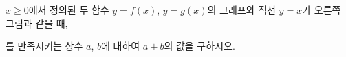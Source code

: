 \noindent\begin{minipage}[t]{0.58\linewidth}\vspace{0pt}\raggedright $x\ge 0$에서 정의된 두 함수 $y=f(x)$, $y=g(x)$의 그래프와 직선 $y=x$가 오른쪽 그림과 같을 때,\par\smallskip\end{minipage}\hfill\begin{minipage}[t]{0.4\linewidth}\vspace{0pt}\centering \resizebox{\ifdim\width>\linewidth\linewidth\else\width\fi}{!}{}\end{minipage}\par
\noindent {}\par{}\par\smallskip\noindent 를 만족시키는 상수 $a$, $b$에 대하여 $a+b$의 값을 구하시오.
